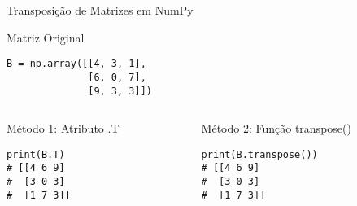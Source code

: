 \begin{frame}[fragile]{Transposição de Matrizes em NumPy}

\begin{block}{Matriz Original}
\begin{verbatim}
B = np.array([[4, 3, 1],
              [6, 0, 7],
              [9, 3, 3]])
\end{verbatim}
\end{block}

\begin{columns}[T]
    \begin{column}{0.5\textwidth}
        \begin{exampleblock}{Método 1: Atributo .T}
\begin{verbatim}
print(B.T)
# [[4 6 9]
#  [3 0 3]
#  [1 7 3]]
\end{verbatim}
        \end{exampleblock}
    \end{column}
    
    \begin{column}{0.5\textwidth}
        \begin{exampleblock}{Método 2: Função transpose()}
\begin{verbatim}
print(B.transpose())
# [[4 6 9]
#  [3 0 3]
#  [1 7 3]]
\end{verbatim}
        \end{exampleblock}
    \end{column}
\end{columns}


\end{frame}